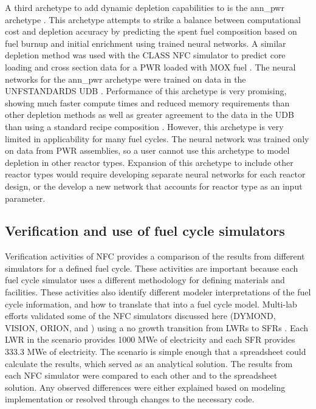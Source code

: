 A third archetype to add dynamic depletion capabilities to \Cyclus 
is the ann\_pwr archetype \cite{bae_deep_2020}. This archetype 
attempts to strike a balance between computational cost and 
depletion accuracy by predicting the spent fuel composition based on 
fuel burnup and initial enrichment using trained neural networks.
A similar depletion method was used with the \gls{CLASS} 
\gls{NFC} simulator to predict core loading and cross section data 
for a \gls{PWR} loaded with \gls{MOX} fuel \cite{leniau_neural_2015}.
The neural networks for the ann\_pwr archetype were trained 
on data in the \gls{UNFSTANDARDS} \gls{UDB} \cite{peterson_used_2013}.
Performance of this archetype is very promising, showing much faster 
compute times and reduced memory requirements than other depletion 
methods as well as greater agreement to the data in the \gls{UDB} than 
using a standard recipe composition \cite{bae_deep_2020}. However, 
this archetype is very limited in applicability for many fuel cycles. 
The neural network was trained only on data from \gls{PWR}
assemblies, so a user cannot use this archetype to model depletion 
in other reactor types. Expansion of this archetype to include 
other reactor types would require developing separate neural networks for 
each reactor design, or the develop a new network that accounts for 
reactor type as an input parameter. 

\subsection{Verification and use of fuel cycle simulators}
Verification activities of \gls{NFC} provides a comparison of the 
results from different simulators for a defined fuel cycle. 
These activities are important because each fuel cycle 
simulator uses a different methodology for defining materials 
and facilities. These activities also identify different 
modeler interpretations of the fuel cycle information, 
and how to translate that into a fuel cycle model. 
Multi-lab efforts validated some of the \gls{NFC} simulators discussed here 
(\gls{DYMOND}, \gls{VISION}, ORION, and \Cyclus)
using a no growth transition from \glspl{LWR} 
to \glspl{SFR} \cite{feng_standardized_2016,bae_standardized_2019}.
Each \gls{LWR} in the scenario provides 1000 MWe of 
electricity and each \gls{SFR} provides 333.3 MWe of electricity. The 
scenario is simple enough that a spreadsheet could calculate the results, 
which served as an analytical solution. The 
results from each \gls{NFC} simulator were compared to each other and 
to the spreadsheet solution. Any observed differences were either explained 
based on modeling implementation or resolved through changes to the 
necessary code.

